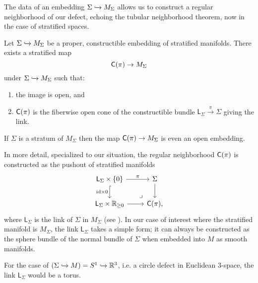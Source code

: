 \documentclass[../text]{subfiles}
\begin{document}
The data of an embedding $\Sigma \xhookrightarrow{} M_\Sigma$ allows us to construct a regular neighborhood of our defect, echoing the tubular neighborhood theorem, now in the case of stratified spaces.
%
\begin{theorem}
    Let $\Sigma \xhookrightarrow{} M_\Sigma$ be a proper, constructible embedding of stratified manifolds. There exists a stratified map
    \begin{equation}
        \cone(\pi) \rightarrow M_\Sigma
    \end{equation}
    under $\Sigma \xhookrightarrow{} M_\Sigma$ such that:
    \begin{enumerate}
        \item the image is open, and
        \item $\cone(\pi)$ is the fiberwise open cone of the constructible bundle $\mathsf{L}_{\Sigma} \xrightarrow{\pi} \Sigma$ giving the link.
    \end{enumerate}
    If $\Sigma$ is a stratum of $M_\Sigma$ then the map $\cone(\pi) \rightarrow M_\Sigma$ is even an open embedding.
\end{theorem}

\begin{remark}
    In more detail, specialized to our situation, the regular neighborhood $\cone(\pi)$ is constructed as the pushout of stratified manifolds
    \begin{equation}
        \begin{tikzcd}
            \mathsf{L}_{\Sigma} \times \{0\} \arrow[r, "\pi"] \arrow[d, "\mathrm{id} \times 0"', hook] & \Sigma \arrow[d] \\
            \mathsf{L}_{\Sigma} \times \hoint \arrow[r] & \cone(\pi) \arrow[ul, phantom, "\lrcorner", very near start],
        \end{tikzcd}
    \end{equation}
    where $\mathsf{L}_{\Sigma}$ is the link of $\Sigma$ in $M_{\Sigma}$ (see \cite{aft_localstrut}). In our case of interest where the stratified manifold is $M_{\Sigma}$, the link $\mathsf{L}_{\Sigma}$ takes a simple form; it can always be constructed as the sphere bundle of the normal bundle of $\Sigma$ when embedded into $M$ as smooth manifolds.
\end{remark}

\begin{example}
    For the case of $(\Sigma \xhookrightarrow{} M) = {S^1 \xhookrightarrow{} \mathbb{R}^3}$, i.e. a circle defect in Euclidean 3-space, the link $\mathsf{L}_{\Sigma}$ would be a torus.
\end{example}
\end{document}
